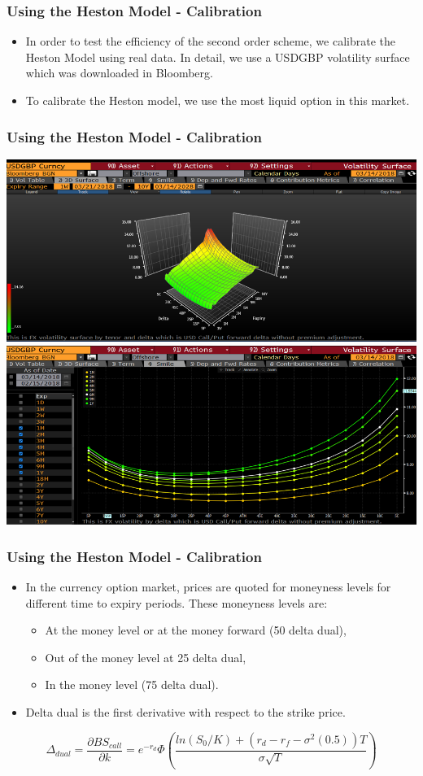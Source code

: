 \documentclass[12pt]{beamer}
\begin{document}
\begin{frame}
\frametitle{Using the Heston Model - Calibration}
\begin{itemize}
  \item In order to test the efficiency of the second order scheme, we calibrate the Heston Model using real data. In detail, we use a USDGBP volatility surface which was downloaded in Bloomberg.
  \item To calibrate the Heston model, we use the most liquid option in this market.
\end{itemize}
\end{frame}

\begin{frame}
\frametitle{Using the Heston Model - Calibration}
\centering
\includegraphics[width=.75\textwidth]{bloomberg1.png}
\\[.5cm]
\includegraphics[width=.75\textwidth]{bloomberg2.png}
\end{frame}

\begin{frame}
\frametitle{Using the Heston Model - Calibration}
\begin{itemize}
  \item In the currency option market, prices are quoted for moneyness levels for different time to expiry periods. These moneyness levels are:
  \begin{itemize}
    \item At the money level or at the money forward (50 delta dual),
    \item Out of the money level at 25 delta dual,
    \item In the money level (75 delta dual).
  \end{itemize}
  \item Delta dual is the first derivative with respect to the strike price.
\end{itemize}
$$\Delta_{dual}=\frac{\partial BS_{call}}{\partial k}=e^{-r_{d}}\Phi \left(\frac{ln(S_{0}/K)+(r_{d}-r_{f}-\sigma^{2}(0.5))T}{\sigma \sqrt T}\right)$$
\end{frame}
\end{document}
